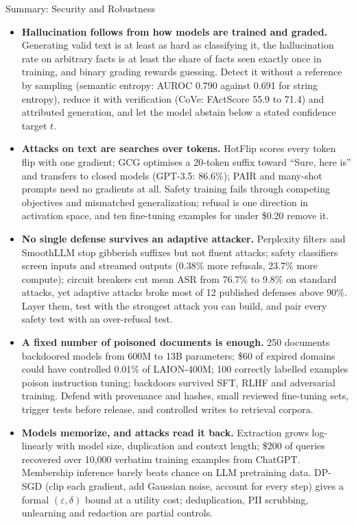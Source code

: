 \begin{frame}{Summary: Security and Robustness}
  \begin{itemize}\scriptsize\setlength{\itemsep}{0.55em}\setlength{\parsep}{0pt}\setlength{\parskip}{0pt}
    \item[\textcolor{red}{$\blacktriangleright$}] \textbf{Hallucination follows from how models are trained and graded.} Generating valid text is at least as hard as classifying it, the hallucination rate on arbitrary facts is at least the share of facts seen exactly once in training, and binary grading rewards guessing. Detect it without a reference by sampling (semantic entropy: AUROC 0.790 against 0.691 for string entropy), reduce it with verification (CoVe: FActScore 55.9 to 71.4) and attributed generation, and let the model abstain below a stated confidence target $t$.
    \item[\textcolor{red}{$\blacktriangleright$}] \textbf{Attacks on text are searches over tokens.} HotFlip scores every token flip with one gradient; GCG optimises a 20-token suffix toward ``Sure, here is'' and transfers to closed models (GPT-3.5: 86.6\%); PAIR and many-shot prompts need no gradients at all. Safety training fails through competing objectives and mismatched generalization; refusal is one direction in activation space, and ten fine-tuning examples for under \$0.20 remove it.
    \item[\textcolor{red}{$\blacktriangleright$}] \textbf{No single defense survives an adaptive attacker.} Perplexity filters and SmoothLLM stop gibberish suffixes but not fluent attacks; safety classifiers screen inputs and streamed outputs (0.38\% more refusals, 23.7\% more compute); circuit breakers cut mean ASR from 76.7\% to 9.8\% on standard attacks, yet adaptive attacks broke most of 12 published defenses above 90\%. Layer them, test with the strongest attack you can build, and pair every safety test with an over-refusal test.
    \item[\textcolor{red}{$\blacktriangleright$}] \textbf{A fixed number of poisoned documents is enough.} 250 documents backdoored models from 600M to 13B parameters; \$60 of expired domains could have controlled 0.01\% of LAION-400M; 100 correctly labelled examples poison instruction tuning; backdoors survived SFT, RLHF and adversarial training. Defend with provenance and hashes, small reviewed fine-tuning sets, trigger tests before release, and controlled writes to retrieval corpora.
    \item[\textcolor{red}{$\blacktriangleright$}] \textbf{Models memorize, and attacks read it back.} Extraction grows log-linearly with model size, duplication and context length; \$200 of queries recovered over 10,000 verbatim training examples from ChatGPT. Membership inference barely beats chance on LLM pretraining data. DP-SGD (clip each gradient, add Gaussian noise, account for every step) gives a formal $(\varepsilon,\delta)$ bound at a utility cost; deduplication, PII scrubbing, unlearning and redaction are partial controls.
  \end{itemize}
\end{frame}

